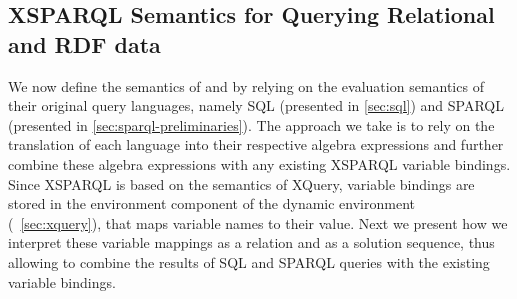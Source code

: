 



\subsection{XSPARQL Semantics for Querying Relational and RDF data}
\label{sec:query-heter-data}

We now define the semantics of  and  by relying on the evaluation semantics of their
original query languages, namely \ac{SQL} (presented in \cref{sec:sql}) and SPARQL (presented in
\cref{sec:sparql-preliminaries}).
%
The approach we take is to rely on the translation of each language into their respective algebra expressions and
further combine these algebra expressions with any existing XSPARQL variable bindings.
%
Since XSPARQL is based on the semantics of XQuery, variable bindings are stored in the  environment
component of the dynamic environment (\cf~\cref{sec:xquery}), that maps variable names to their value.
%
Next we present how we interpret these variable mappings as a relation and as a solution sequence, thus allowing to
combine the results of \ac{SQL} and SPARQL queries with the existing variable bindings.









